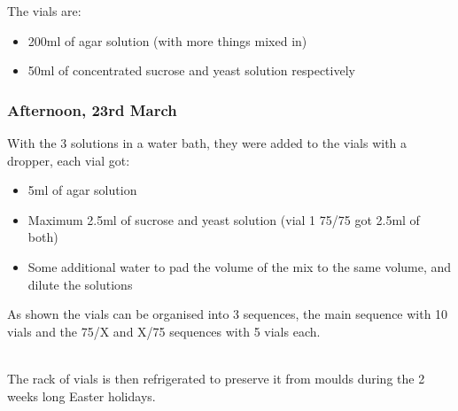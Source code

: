 \documentclass{article}
\begin{document}
\noindent
The vials are:

\begin{itemize}
  \item 200ml of agar solution (with more things mixed in)
  \item 50ml of concentrated sucrose and yeast solution respectively
\end{itemize}

\subsubsection{Afternoon, 23rd March}

With the 3 solutions in a water bath, they were added to the vials with a dropper, each vial got:

\begin{itemize}
  \item 5ml of agar solution
  \item Maximum 2.5ml of sucrose and yeast solution (vial 1 75/75 got 2.5ml of both)
  \item Some additional water to pad the volume of the mix to the same volume, and dilute the solutions
\end{itemize}

\noindent
As shown the vials can be organised into 3 sequences, the main sequence with 10 vials and the 75/X and X/75 sequences with 5 vials each.

\begin{figure}[ht]
  \centering
  \hfill
\end{figure}

\noindent\\
The rack of vials is then refrigerated to preserve it from moulds during the 2 weeks long Easter holidays.
\end{document}
